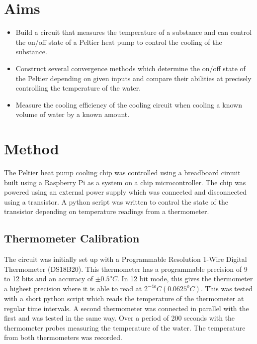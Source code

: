 \documentclass[10pt]{article}
\begin{document}


\section*{Aims}
\begin{itemize}
    \item Build a circuit that measures the temperature of a substance and can control the on/off state of a Peltier heat pump\cite{peltier}\cite{pelt} to control the cooling of the substance. 
    \item Construct several convergence methods which determine the on/off state of the Peltier depending on given inputs and compare their abilities at precisely controlling the temperature of the water.
    \item Measure the cooling efficiency of the cooling circuit when cooling a known volume of water by a known amount.
\end{itemize}
\section*{Method}
The Peltier heat pump cooling chip was controlled using a breadboard circuit built using a Raspberry Pi\cite{rpi} as a system on a chip microcontroller. The chip was powered using an external power supply which was connected and disconnected using a transistor. A python script was written to control the state of the transistor depending on temperature readings from a thermometer. \\

\subsection*{Thermometer Calibration}

The circuit was initially set up with a Programmable Resolution 1-Wire Digital Thermometer (DS18B20)\cite{thermometer}. This thermometer has a programmable precision of 9 to 12 bits and an accuracy of $\pm 0.5^oC$. In 12 bit mode, this gives the thermometer a highest precision where it is able to read at $2^{-4o} C (0.0625^o C)$. This was tested with a short python script which reads the temperature of the thermometer at regular time intervals. A second thermometer was connected in parallel with the first and was tested in the same way. Over a period of 200 seconds with the thermometer probes measuring the temperature of the water. The temperature from both thermometers was recorded.
\end{document}
